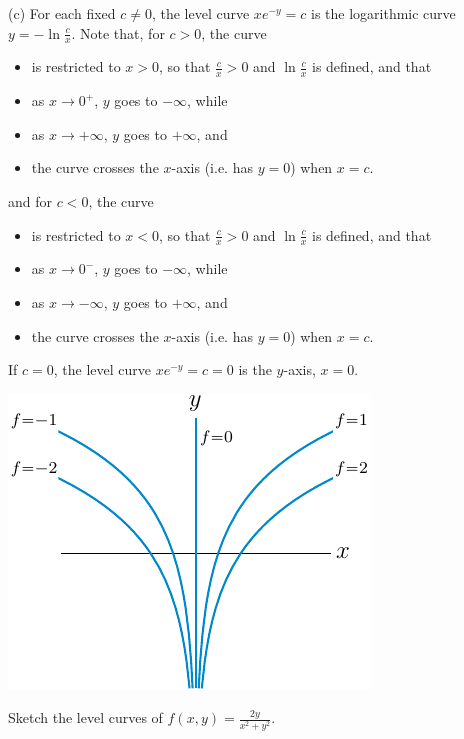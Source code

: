 \begin{solution}
(c)
For each fixed $c\ne 0$, the level curve $xe^{-y}=c$ is the logarithmic curve
$y=-\ln\frac{c}{x}$. Note that, for $c>0$, the curve
\begin{itemize}\itemsep1pt \parskip0pt 
\item is restricted to $x>0$, so that $\frac{c}{x}>0$ and $\ln \frac{c}{x}$
  is defined, and that
\item as $x\rightarrow 0^+$, $y$ goes to $-\infty$, while
\item as $x\rightarrow +\infty$, $y$ goes to $+\infty$, and
\item the curve crosses the $x$-axis (i.e. has $y=0$) when $x=c$.
\end{itemize}
and for $c<0$, the curve
\begin{itemize}\itemsep1pt \parskip0pt 
\item is restricted to $x<0$, so that $\frac{c}{x}>0$ and $\ln \frac{c}{x}$
  is defined, and that
\item as $x\rightarrow 0^-$, $y$ goes to $-\infty$, while
\item as $x\rightarrow -\infty$, $y$ goes to $+\infty$, and
\item the curve crosses the $x$-axis (i.e. has $y=0$) when $x=c$.
\end{itemize}
If $c=0$,  the level curve $xe^{-y}=c=0$
is the $y$-axis, $x=0$.
\begin{center}
     \includegraphics{fig/levelLog.pdf}
\end{center}



\end{solution}



\begin{question}[M200 2010D] %
Sketch the level curves of $f(x,y)=\frac{2y}{x^2+y^2}$.
\end{question}

